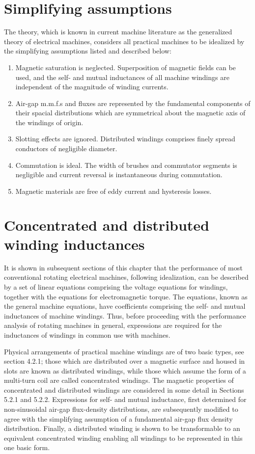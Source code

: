 \documentclass[a4paper,numbers=noenddot,12pt]{scrbook}
\begin{document}
\section{Simplifying assumptions}
The theory, which is known in current machine literature as the generalized theory of electrical machines, considers all practical machines to be idealized by the simplifying assumptions listed and described below:
\begin{enumerate}
    \item Magnetic saturation is neglected. Superposition of magnetic fields can be  used, and the self- and mutual inductances of all machine windings are independent of the magnitude of winding currents.
    \item Air-gap m.m.f.s and fluxes are represented by the fundamental components of their spacial distributions which are symmetrical about the magnetic axis of the windings of origin.
    \item Slotting effects are ignored. Distributed windings comprises finely spread conductors of negligible diameter.
    \item Commutation is ideal. The width of brushes and commutator segments is negligible and current reversal is instantaneous during commutation.
    \item Magnetic materials are free of eddy current and hysteresis losses.
\end{enumerate}
\section{Concentrated and distributed winding inductances}
It is shown in subsequent sections of this chapter that the performance of most conventional rotating electrical machines, following idealization, can be described by a set of linear equations comprising the voltage equations for windings, together with the equations for electromagnetic torque. The equations, known as the general machine equations, have coefficients comprising the self- and mutual inductances of machine windings. Thus, before proceeding with the performance analysis of rotating machines in general, expressions are required for the inductances of windings in common use with machines.

Physical arrangements of practical machine windings are of two basic types, see section 4.2.1; those which are distributed over a magnetic surface and housed in slots are known as distributed windings, while those which assume the form of a multi-turn coil are called concentrated windings. The magnetic properties of concentrated and distributed windings are considered in some detail in Sections 5.2.1 and 5.2.2. Expressions for self- and mutual inductance, first determined for non-sinusoidal air-gap flux-density distributions, are subsequently modified to agree with the simplifying assumption of a fundamental air-gap flux density distribution. Finally, a distributed winding is shown to be transformable to an equivalent concentrated winding enabling all windings to be represented in this one basic form.
\end{document}
